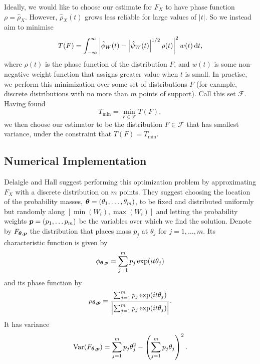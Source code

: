 	Ideally, we would like to choose our estimate for $F_X$ to have phase function $\rho = \hat{\rho}_X$. However, $\hat{\rho}_X(t)$ grows less reliable for large values of $|t|$. So we instead aim to minimise 
	\begin{equation}
		T(F) = \int_{-\infty}^\infty \left| \hat{\phi}_W(t) - \left|\hat{\psi}_W(t)\right|^{1/2} \rho(t) \right|^2 w(t) \, \mathrm{d} t,
	\end{equation}
	where $\rho(t)$ is the phase function of the distribution $F$, and $w(t)$ is some non-negative weight function that assigns greater value when $t$ is small. In practise, we perform this minimization over some set of distributions $F$ (for example, discrete distributions with no more than $m$ points of support). Call this set $\mathscr{F}$. Having found
	\begin{equation}
		T_\mathrm{min} = \min_{F \in \mathscr{F}} T(F),
	\end{equation}
	we then choose our estimator to be the distribution $F \in \mathscr{F}$ that has smallest variance, under the constraint that $T(F) = T_\mathrm{min}$.

	\subsection{Numerical Implementation}

	Delaigle and Hall suggest performing this optimization problem by approximating $F_X$ with a discrete distribution on $m$ points. They suggest choosing the location of the probability masses, ${\bm{{\theta}}} = (\theta_1, \dots, \theta_m)$, to be fixed and distributed uniformly but randomly along $[\min(W_i), \max(W_i)]$ and letting the probability weights ${\bm{{p}}} = (p_1, \dots p_m)$ be the variables over which we find the solution. Denote by $F_{{\bm{{\theta}}}, {\bm{{p}}}}$ the distribution that places mass $p_j$ at $\theta_j$ for $j = 1,\dots, m$. Its characteristic function is given by
	\begin{equation}
		\phi_{{\bm{{\theta}}}, {\bm{{p}}}} = \sum_{j = 1}^m p_j \exp(it\theta_j)
	\end{equation}
	and its phase function by
	\begin{equation}
		\rho_{{\bm{{\theta}}}, {\bm{{p}}}} = \frac{ \sum_{j = 1}^m p_j \exp(it\theta_j)}{\left| \sum_{j = 1}^m p_j \exp(it\theta_j)\right|}.
	\end{equation}
	It has variance
	\begin{equation}
		\mathrm{Var}(F_{{\bm{{\theta}}}, {\bm{{p}}}}) = \sum_{j = 1}^m p_j \theta_j^2 - \left( \sum_{j=1}^m p_j \theta_j \right)^2.
	\end{equation}

